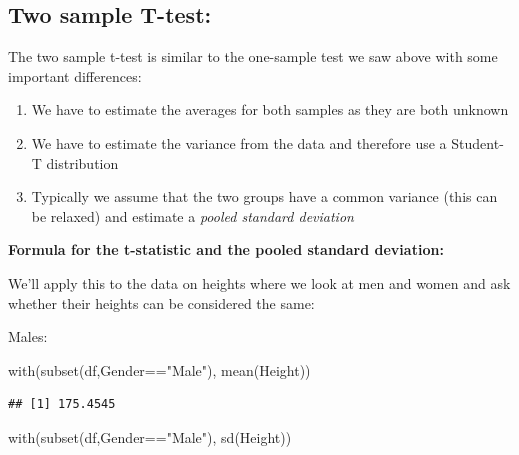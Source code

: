 \documentclass[
]{gitbook}
\newenvironment{Shaded}{\begin{snugshade}}{\end{snugshade}}
\newcommand{\FunctionTok}[1]{\textcolor[rgb]{0.00,0.00,0.00}{#1}}
\newcommand{\NormalTok}[1]{#1}
\newcommand{\SpecialCharTok}[1]{\textcolor[rgb]{0.00,0.00,0.00}{#1}}
\newcommand{\StringTok}[1]{\textcolor[rgb]{0.31,0.60,0.02}{#1}}
\providecommand{\tightlist}{%
  \setlength{\itemsep}{0pt}\setlength{\parskip}{0pt}}
\begin{document}
\hypertarget{two-sample-t-test}{%
\subsection{Two sample T-test:}\label{two-sample-t-test}}

The two sample t-test is similar to the one-sample test we saw above with some important differences:

\begin{enumerate}
\def\labelenumi{\arabic{enumi}.}
\tightlist
\item
  We have to estimate the averages for both samples as they are both unknown
\item
  We have to estimate the variance from the data and therefore use a Student-T distribution
\item
  Typically we assume that the two groups have a common variance (this can be relaxed) and estimate a \emph{pooled standard deviation}
\end{enumerate}

\textbf{Formula for the t-statistic and the pooled standard deviation:}


We'll apply this to the data on heights where we look at men and women and ask whether their heights can be considered the same:

Males:

\begin{Shaded}
\begin{Highlighting}[]
\FunctionTok{with}\NormalTok{(}\FunctionTok{subset}\NormalTok{(df,Gender}\SpecialCharTok{==}\StringTok{"Male"}\NormalTok{), }\FunctionTok{mean}\NormalTok{(Height))}
\end{Highlighting}
\end{Shaded}

\begin{verbatim}
## [1] 175.4545
\end{verbatim}

\begin{Shaded}
\begin{Highlighting}[]
\FunctionTok{with}\NormalTok{(}\FunctionTok{subset}\NormalTok{(df,Gender}\SpecialCharTok{==}\StringTok{"Male"}\NormalTok{), }\FunctionTok{sd}\NormalTok{(Height))}
\end{Highlighting}
\end{Shaded}
\end{document}
